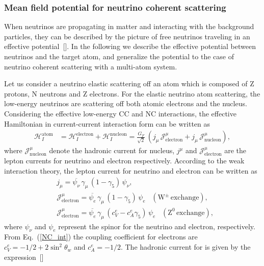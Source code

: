 \subsubsection{Mean field potential for neutrino coherent scattering}
When neutrinos are propagating in matter and interacting with the background particles, they can be described by the picture of free neutrinos traveling in an effective potential~[\cite{PhysRevD.17.2369}]. In the following we describe the effective potential between neutrinos and the target atom, and generalize the potential to the case of neutrino coherent scattering with a multi-atom system.


Let us consider a neutrino elastic scattering off an atom which is composed of Z protons, N neutrons and Z electrons. For the elastic neutrino atom scattering, the low-energy neutrinos are scattering off both atomic electrons and the nucleus. Considering the effective low-energy CC and NC interactions, the effective Hamiltonian in current-current interaction form can be written as 
\begin{align}
\label{H_atom}
\mathcal{H}_I^{\mathrm{atom}}&=\mathcal{H}^\mathrm{electron}_I+\mathcal{H}^\mathrm{nucleon}_I=\frac{G_F}{\sqrt{2}}\,\left(j_\mu\,\mathcal{J}^\mu_{\mathrm{electron}}+j_\mu\,\mathcal{J}^\mu_\mathrm{nucleon}\right),
\end{align}
where $\mathcal{J}^\mu_{\mathrm{nucleon}}$ denote the hadronic current for nucleus, $j^\mu$ and $\mathcal{J}^\mu_{\mathrm{electron}}$ are the lepton currents for neutrino and electron respectively. According to the weak interaction theory, the lepton current for neutrino and  electron can be written as
\begin{align}
&j_\mu=\overline{\psi_{\nu}}\,\gamma_\mu\,\left(1-\gamma_5\right)\,\psi_\nu,\\
\label{Current_e}
&\mathcal{J}^\mu_{\mathrm{electron}}=\overline{\psi_{e}}\,\gamma_\mu\,\left(1-\gamma_5\right)\,\psi_e\,\,\,\,\,(\mathrm{W^\pm\,exchange}),\\
&\mathcal{J}^\mu_{\mathrm{electron}}=\overline{\psi_{e}}\,\gamma_\mu\,\left(c_V^e-c_A^e\gamma_5\right)\,\psi_e\,\,\,\,\,(\mathrm{Z^0\,exchange}),
\end{align}
where  $\psi_\nu$ and $\psi_e$ represent the spinor for the neutrino and electron, respectively. From Eq.~(\ref{NC_int}) the coupling coefficient for electrons are $c^e_V=-1/2+2\sin^2\theta_w$ and $c^e_A=-1/2$. The hadronic current for is given by the expression~[\cite{Giunti:2007ry}]
